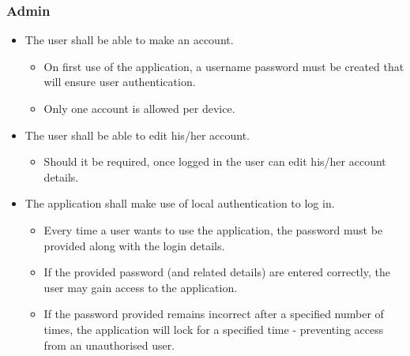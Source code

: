 \subsubsection{Admin}
\begin{itemize}
\item The user shall be able to make an account.
\begin{itemize}
\item On first use of the application, a username password must be created that will ensure user authentication.
\item Only one account is allowed per device.
\end{itemize}
\item The user shall be able to edit his/her account.
\begin{itemize}
\item Should it be required, once logged in the user can edit his/her account details.
\end{itemize}
\item The application shall make use of local authentication to log in.
\begin{itemize}
\item Every time a user wants to use the application, the password must be provided along with the login details.
\item If the provided password (and related details) are entered correctly, the user may gain access to the application.
\item If the password provided remains incorrect after a specified number of times, the application will lock for a specified time - preventing access from an unauthorised user.
\end{itemize}
\end{itemize}

